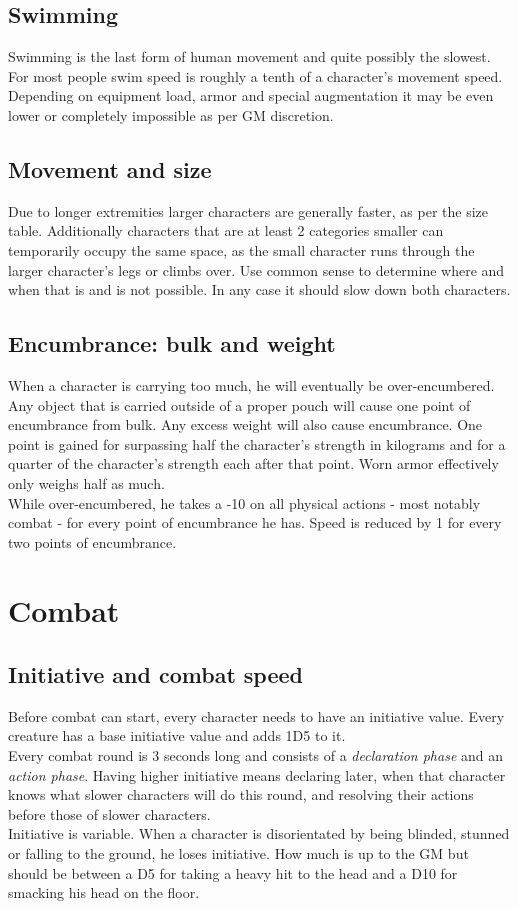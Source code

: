 \documentclass[12pt,a4paper]{book}
\begin{document}
	\section{Swimming}
	Swimming is the last form of human movement and quite possibly the slowest. For most people swim speed is roughly a tenth of a character’s movement speed. Depending on equipment load, armor and special augmentation it may be even lower or completely impossible as per GM discretion.
	\section{Movement and size}
	Due to longer extremities larger characters are generally faster, as per the size table. Additionally characters that are at least 2 categories smaller can temporarily occupy the same space, as the small character runs through the larger character’s legs or climbs over. Use common sense to determine where and when that is and is not possible. In any case it should slow down both characters.
	\section{Encumbrance: bulk and weight}
	When a character is carrying too much, he will eventually be over-encumbered. Any object that is carried outside of a proper pouch will cause one point of encumbrance from bulk.
	Any excess weight will also cause encumbrance. One point is gained for surpassing half the character’s strength in kilograms and for a quarter of the character’s strength each after that point. Worn armor effectively only weighs half as much.\\
	While over-encumbered, he takes a -10 on all physical actions - most notably combat - for every point of encumbrance he has. Speed is reduced by 1 for every two points of encumbrance.
	
	\chapter{Combat}
	\section{Initiative and combat speed}
	Before combat can start, every character needs to have an initiative value. Every creature has a base initiative value and adds 1D5 to it.\\
	Every combat round is 3 seconds long and consists of a \textit{declaration phase} and an \textit{action phase}. Having higher initiative means declaring later, when that character knows what slower characters will do this round, and resolving their actions before those of slower characters.\\
	Initiative is variable. When a character is disorientated by being blinded, stunned or falling to the ground, he loses initiative. How much is up to the GM but should be between a D5 for taking a heavy hit to the head and a D10 for smacking his head on the floor.
\end{document}
